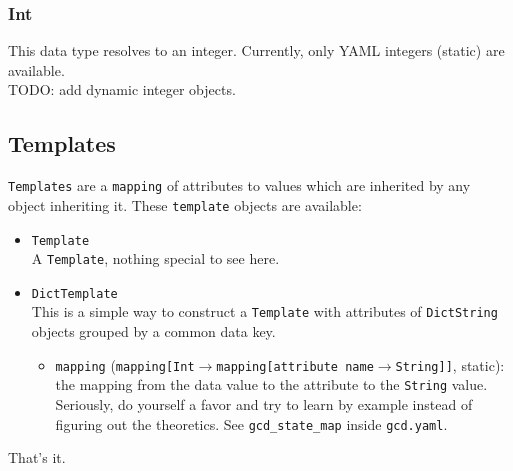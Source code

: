 \documentclass[11pt]{article}
\begin{document}
\subsubsection {Int}
This data type resolves to an integer. Currently, only YAML integers (static) are available. \\
TODO: add dynamic integer objects.

\subsection {Templates}
\texttt{Templates} are a \texttt{mapping} of attributes to values which are inherited by any object inheriting it. These \texttt{template} objects are available:
\begin{itemize}
  \item \texttt{Template} \\
  A \texttt{Template}, nothing special to see here.
  \item \texttt{DictTemplate} \\
  This is a simple way to construct a \texttt{Template} with attributes of \texttt{DictString} objects grouped by a common data key.
  \begin{itemize}
    \item \texttt{mapping} (\texttt{mapping[Int$\rightarrow$mapping[attribute name$\rightarrow$String]]}, static): the mapping from the data value to the attribute to the \texttt{String} value. Seriously, do yourself a favor and try to learn by example instead of figuring out the theoretics. See \texttt{gcd\_state\_map} inside \texttt{gcd.yaml}.
  \end{itemize}
\end{itemize}

That's it.
\end{document}
